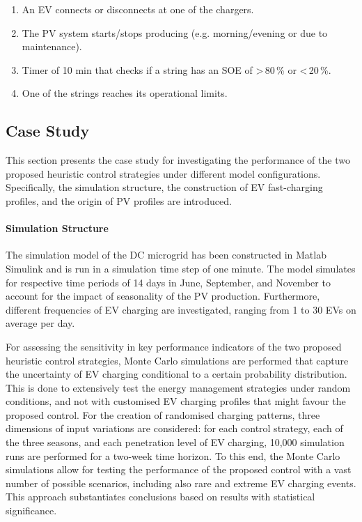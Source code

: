 \documentclass[final,5p,times,twocolumn]{elsarticle}
\begin{document}
\begin{enumerate}
    \item An EV connects or disconnects at one of the chargers.
    \item The PV system starts/stops producing (e.g. morning/evening or due to maintenance).
    \item Timer of 10 min that checks if a string has an SOE of \textgreater\,80\,\% or \textless\,20\,\%. 
    \item One of the strings reaches its operational limits.
\end{enumerate}

\subsection{Case Study}\label{sec:casestudy}

This section presents the case study for investigating the performance of the two proposed heuristic control strategies under different model configurations. Specifically, the simulation structure, the construction of EV fast-charging profiles, and the origin of PV profiles are introduced.

\paragraph{Simulation Structure}

The simulation model of the DC microgrid has been constructed in Matlab Simulink and is run in a simulation time step of one minute. The model simulates for respective time periods of 14 days in June, September, and November to account for the impact of seasonality of the PV production. Furthermore, different frequencies of EV charging are investigated, ranging from 1 to 30 EVs on average per day.

For assessing the sensitivity in key performance indicators of the two proposed heuristic control strategies, Monte Carlo simulations are performed that capture the uncertainty of EV charging conditional to a certain probability distribution. This is done to extensively test the energy management strategies under random conditions, and not with customised EV charging profiles that might favour the proposed control. For the creation of randomised charging patterns, three dimensions of input variations are considered: for each control strategy, each of the three seasons, and each penetration level of EV charging, 10,000 simulation runs are performed for a two-week time horizon. To this end, the Monte Carlo simulations allow for testing the performance of the proposed control with a vast number of possible scenarios, including also rare and extreme EV charging events. This approach substantiates conclusions based on results with statistical significance.   
\end{document}
